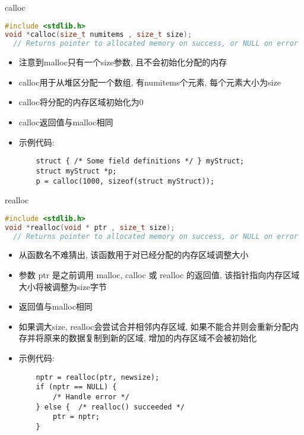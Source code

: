 \begin{frame}[fragile]{calloc}
    \scriptsize\begin{lstlisting}[language=c]
#include <stdlib.h>
void *calloc(size_t numitems , size_t size);
  // Returns pointer to allocated memory on success, or NULL on error
    \end{lstlisting}
    \normalsize
    \begin{itemize}[<+- | alert@+>]
        \item 注意到malloc只有一个size参数, 且不会初始化分配的内存
        \item calloc用于从堆区分配一个数组, 有numitems个元素, 每个元素大小为size
        \item calloc将分配的内存区域初始化为0
        \item calloc返回值与malloc相同
        \item 示例代码:
        \scriptsize\begin{verbatim}
    struct { /* Some field definitions */ } myStruct;
    struct myStruct *p;
    p = calloc(1000, sizeof(struct myStruct));
        \end{verbatim}
    \end{itemize}
\end{frame}

\begin{frame}[fragile]{realloc}
    \scriptsize\begin{lstlisting}[language=c]
#include <stdlib.h>
void *realloc(void * ptr , size_t size);
  // Returns pointer to allocated memory on success, or NULL on error
    \end{lstlisting}
    \normalsize
    \begin{itemize}[<+- | alert@+>]
        \item 从函数名不难猜出, 该函数用于对已经分配的内存区域调整大小
        \item 参数 ptr 是之前调用 malloc, calloc 或 realloc 的返回值, 该指针指向内存区域大小将被调整为size字节
        \item 返回值与malloc相同
        \item 如果调大size, realloc会尝试合并相邻内存区域, 如果不能合并则会重新分配内存并将原来的数据复制到新的区域, 增加的内存区域不会被初始化
        \item 示例代码:
        \scriptsize\begin{verbatim}
    nptr = realloc(ptr, newsize);
    if (nptr == NULL) {
        /* Handle error */
    } else {  /* realloc() succeeded */
        ptr = nptr;
    }
        \end{verbatim}
    \end{itemize}
\end{frame}

